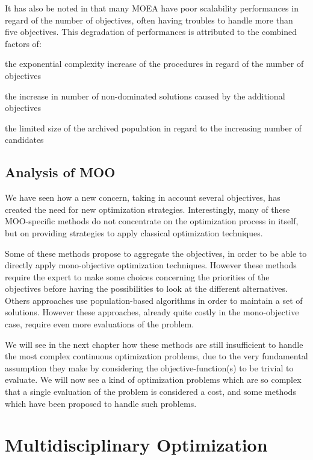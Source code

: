 It has also be noted in \cite{corne2007techniques} that many MOEA have poor scalability performances in regard of the number of objectives, often having troubles to handle more than five objectives. This degradation of performances is attributed to the combined factors of:
\begin{compactitem}
\item the exponential complexity increase of the procedures in regard of the number of objectives
\item the increase in number of non-dominated solutions caused by the additional objectives
\item the limited size of the archived population in regard to the increasing number of candidates
\end{compactitem}

\section{Analysis of MOO}

We have seen how a new concern, taking in account several objectives, has created the need for new optimization strategies. Interestingly, many of these MOO-specific methods do not concentrate on the optimization process in itself, but on providing strategies to apply classical optimization techniques.

Some of these methods propose to aggregate the objectives, in order to be able to directly apply mono-objective optimization techniques. However these methods require the expert to make some choices concerning the priorities of the objectives before having the possibilities to look at the different alternatives.\\
Others approaches use population-based algorithms in order to maintain a set of solutions. However these approaches, already quite costly in the mono-objective case, require even more evaluations of the problem.

We will see in the next chapter how these methods are still insufficient to handle the most complex continuous optimization problems, due to the very fundamental assumption they make by considering the objective-function(s) to be trivial to evaluate. We will now see a kind of optimization problems which are so complex that a single evaluation of the problem is considered a cost, and some methods which have been proposed to handle such problems.

\chapter{Multidisciplinary Optimization}\label{MDO_chapter}

